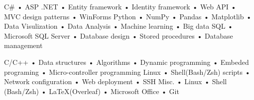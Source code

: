 


\vspace{-3mm}
\begin{minipage}[t]{0.48\textwidth}
\begin{cvskills}
  \cvskill
  {C\#} %
  {• ASP .NET • Entity framework • Identity framework • Web API • MVC design patterns • WinForms} %
  \cvskill
  {Python}
  {• NumPy • Pandas • Matplotlib • Data Visulization • Data Analysis • Machine learning • Big data}
  \cvskill
  {SQL}
  {• Microsoft SQL Server • Database design • Stored procedures • Database management}
\end{cvskills}
\end{minipage}
\hspace{0.04\textwidth}
\begin{minipage}[t]{0.48\textwidth}
\begin{cvskills}
  \cvskill
  {C/C++}
  {• Data structures • Algorithms • Dynamic programming • Embeded programing • Micro-controller programming}
  \cvskill
  {Linux}
  {• Shell(Bash/Zsh) scripts • Network configuration • Web deployment • SSH}
  \cvskill
  {Misc.} %
  {• Linux • Shell (Bash/Zsh) • \LaTeX (Overleaf) • Microsoft Office • Git} %
\end{cvskills}
\end{minipage}
